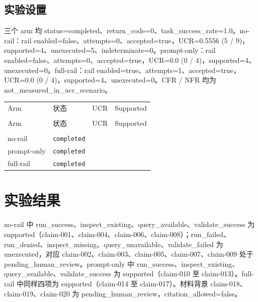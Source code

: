 \documentclass[UTF8]{ctexart}
\begin{document}
\subsection{实验设置}
三个 arm 均 status=completed、return\_\allowbreak{}code=0、task\_\allowbreak{}success\_\allowbreak{}rate=1.0。no-\allowbreak{}rail：rail enabled=false、attempts=0、accepted=true，UCR=0.5556 (5 / 9)，supported=4、unexecuted=5、indeterminate=0。prompt-\allowbreak{}only：rail enabled=false、attempts=0、accepted=true，UCR=0.0 (0 / 4)，supported=4、unexecuted=0。full-\allowbreak{}rail：rail enabled=true、attempts=1、accepted=true，UCR=0.0 (0 / 4)，supported=4、unexecuted=0。CFR / NFR 均为 not\_\allowbreak{}measured\_\allowbreak{}in\_\allowbreak{}ucr\_\allowbreak{}scenario。
\begin{longtable}{@{}>{\raggedright\arraybackslash}p{}>{\raggedright\arraybackslash}p{}>{\raggedleft\arraybackslash}p{}>{\raggedleft\arraybackslash}p{}@{}}
\toprule
Arm & 状态 & UCR & Supported\\\\
\midrule
\endfirsthead
\toprule
Arm & 状态 & UCR & Supported\\\\
\midrule
\endhead
no-\allowbreak{}rail & \texttt{\scriptsize completed} & 0.5556 & 4 \\
prompt-\allowbreak{}only & \texttt{\scriptsize completed} & 0.0 & 4 \\
full-\allowbreak{}rail & \texttt{\scriptsize completed} & 0.0 & 4 \\
\bottomrule
\end{longtable}
\section{实验结果}
no-\allowbreak{}rail 中 run\_\allowbreak{}success、inspect\_\allowbreak{}existing、query\_\allowbreak{}available、validate\_\allowbreak{}success 为 supported（claim-\allowbreak{}001、claim-\allowbreak{}004、claim-\allowbreak{}006、claim-\allowbreak{}008）；run\_\allowbreak{}failed、run\_\allowbreak{}denied、inspect\_\allowbreak{}missing、query\_\allowbreak{}unavailable、validate\_\allowbreak{}failed 为 unexecuted，对应 claim-\allowbreak{}002、claim-\allowbreak{}003、claim-\allowbreak{}005、claim-\allowbreak{}007、claim-\allowbreak{}009 处于 pending\_\allowbreak{}human\_\allowbreak{}review。prompt-\allowbreak{}only 中 run\_\allowbreak{}success、inspect\_\allowbreak{}existing、query\_\allowbreak{}available、validate\_\allowbreak{}success 为 supported（claim-\allowbreak{}010 至 claim-\allowbreak{}013）。full-\allowbreak{}rail 中同样四项为 supported（claim-\allowbreak{}014 至 claim-\allowbreak{}017）。材料背景 claim-\allowbreak{}018、claim-\allowbreak{}019、claim-\allowbreak{}020 为 pending\_\allowbreak{}human\_\allowbreak{}review，citation\_\allowbreak{}allowed=false。
\end{document}
